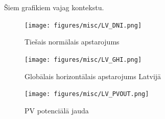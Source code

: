 Šiem grafikiem vajag kontekstu.
\begin{figure}[h]
    \centering
    \texttt{[image: figures/misc/LV\_DNI.png]}
    \caption{Tiešais normālais apstarojums \cite{solargis}}
    \label{fig:lv_DNI}
\end{figure}
\begin{figure}[h]
    \centering
    \texttt{[image: figures/misc/LV\_GHI.png]}
    \caption{Globālais horizontālais apstarojums Latvijā \cite{solargis}}
    \label{fig:lv_GHI}
\end{figure}
\begin{figure}[h]
    \centering
    \texttt{[image: figures/misc/LV\_PVOUT.png]}
    \caption{PV potenciālā jauda \cite{solargis}}
    \label{fig:lv_PVOUT}
\end{figure}
